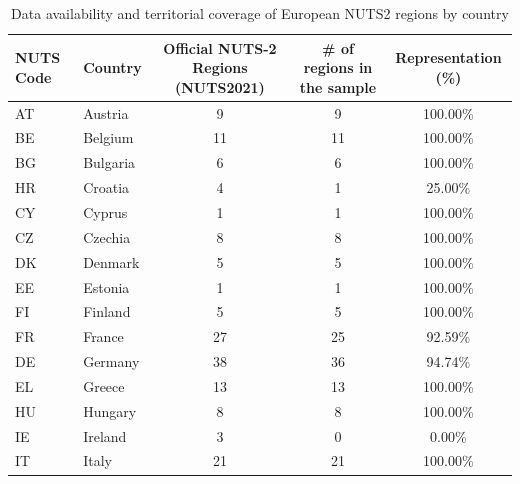 \documentclass[a4paper,11pt,oneside]{article}
\begin{document}
\begin{table}[]
\centering
\caption{Data availability and territorial coverage of European NUTS2 regions by country}
\label{tbl:tabla_2_drive}
\footnotesize
\begin{tabular}{llccc}
\toprule
NUTS Code & Country         & \parbox[c]{35mm}{\centering Official NUTS-2 Regions (NUTS2021)} & \parbox[c]{35mm}{\centering \# of regions in the sample} & Representation (\%) \\
\midrule
AT        & Austria         & 9                                  & 9                 & 100.00\%            \\
BE        & Belgium         & 11                                 & 11                & 100.00\%            \\
BG        & Bulgaria        & 6                                  & 6                 & 100.00\%            \\
HR        & Croatia         & 4                                  & 1                 & 25.00\%             \\
CY        & Cyprus          & 1                                  & 1                 & 100.00\%            \\
CZ        & Czechia         & 8                                  & 8                 & 100.00\%            \\
DK        & Denmark         & 5                                  & 5                 & 100.00\%            \\
EE        & Estonia         & 1                                  & 1                 & 100.00\%            \\
FI        & Finland         & 5                                  & 5                 & 100.00\%            \\
FR        & France          & 27                                 & 25                & 92.59\%             \\
DE        & Germany         & 38                                 & 36                & 94.74\%             \\
EL        & Greece          & 13                                 & 13                & 100.00\%            \\
HU        & Hungary         & 8                                  & 8                 & 100.00\%            \\
IE        & Ireland         & 3                                  & 0                 & 0.00\%              \\
IT        & Italy           & 21                                 & 21                & 100.00\%            \\

\end{tabular}
\end{table}
\end{document}
